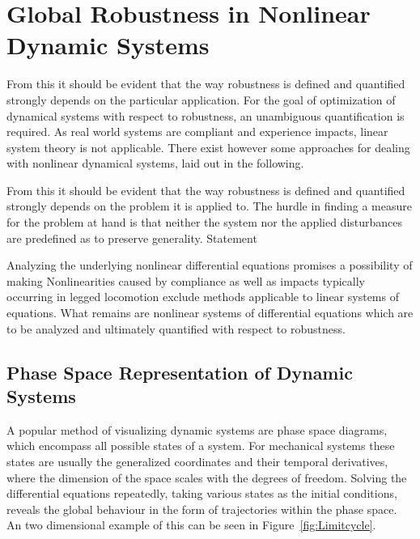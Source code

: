 \section{Global Robustness in Nonlinear Dynamic Systems} \label{Global Robustness}
From this it should be evident that the way robustness is defined and quantified strongly depends on the particular application.
For the goal of optimization of dynamical systems with respect to robustness, an unambiguous quantification is required. As real world systems are compliant and experience impacts, linear system theory is not applicable. There exist however some approaches for dealing with nonlinear dynamical systems, laid out in the following. 

\iffalse
From this it should be evident that the way robustness is defined and quantified strongly depends on the problem it is applied to. The hurdle in finding a measure for the problem at hand is that neither the system nor the applied disturbances are predefined as to preserve generality. Statement

Analyzing the underlying nonlinear differential equations promises a possibility of making
Nonlinearities caused by compliance as well as impacts typically occurring in legged locomotion exclude methods applicable to linear systems of equations. 
What remains are nonlinear systems of differential equations which are to be analyzed and ultimately quantified with respect to robustness. 

\subsection{Phase Space Representation of Dynamic Systems} \label{Phase Space}
A popular method of visualizing dynamic systems are phase space diagrams, which encompass all possible states of a system. For mechanical systems these states are usually the generalized coordinates and their temporal derivatives, where the dimension of the space scales with the degrees of freedom. Solving the differential equations repeatedly, taking various states as the initial conditions, reveals the global behaviour in the form of trajectories within the phase space. An two dimensional example of this can be seen in Figure~\ref{fig:Limitcycle}.

